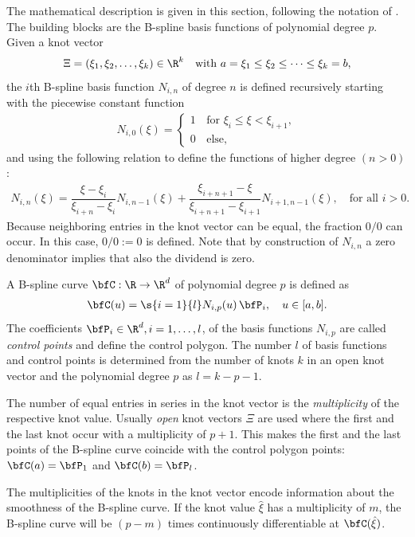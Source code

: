 The mathematical description is given in this section, following the notation of \cite{piegl2012nurbs}. The building blocks are the B-spline basis functions of polynomial degree $p$. Given a knot vector 
%
\begin{align*}
  \Xi = (\xi_1, \xi_2, \dots, \xi_k) \in \R^k \quad \text{with } a=\xi_1 \leq \xi_2 \leq \cdots \leq \xi_k = b,
\end{align*}
%
the $i$th B-spline basis function $N_{i,n}$ of degree $n$ is defined recursively starting with the piecewise constant function
%
\begin{align*}
  N_{i,0}(\xi) = \begin{cases} 
    1 \, &\text{for }\xi_i \leq \xi < \xi_{i+1},\\[2mm]
    0 &\text{else},
  \end{cases}
\end{align*}
and using the following relation to define the functions of higher degree $(n > 0)$:
\begin{align*}
  N_{i,n}(\xi) = \dfrac{\xi - \xi_i}{\xi_{i+n} - \xi_i} N_{i,n-1}(\xi) + \dfrac{\xi_{i+n+1} - \xi}{\xi_{i+n+1} - \xi_{i+1}} N_{i+1,n-1}(\xi), \quad \text{for all }i > 0.
\end{align*}
Because neighboring entries in the knot vector can be equal, the fraction $0/0$ can occur. In this case, $0/0 := 0$ is defined. Note that by construction of $N_{i,n}$ a zero denominator implies that also the dividend is zero.

A B-spline curve $\bfC: \R \to \R^d$ of polynomial degree $p$ is defined as
%
\begin{align*}
  \bfC(u) = \s{i=1}{l}N_{i,p}(u)\,\bfP_i, \quad u \in [a,b].
\end{align*}
%
The coefficients $\bfP_i \in \R^d, i=1, \dots, l$, of the basis functions $N_{i,p}$ are called \emph{control points} and define the control polygon. The number $l$ of basis functions and control points is determined from the number of knots $k$ in an open knot vector and the polynomial degree $p$ as $l = k-p-1$.

The number of equal entries in series in the knot vector is the \emph{multiplicity} of the respective knot value. Usually \emph{open} knot vectors $\Xi$ are used where the first and the last knot occur with a multiplicity of $p+1$.
This makes the first and the last points of the B-spline curve coincide with the control polygon points: $\bfC(a) = \bfP_1$ and $\bfC(b) = \bfP_l$.

The multiplicities of the knots in the knot vector encode information about the smoothness of the B-spline curve. If the knot value $\hat{\xi}$ has a multiplicity of $m$, the B-spline curve will be $(p-m)$ times continuously differentiable at $\bfC(\hat{\xi})$.

